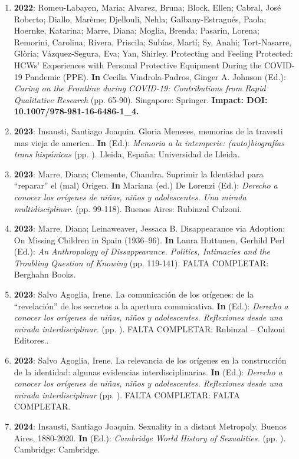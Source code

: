 \begin{enumerate}
\item {\bf 2022}: Romeu-Labayen, Maria; Alvarez, Bruna; Block, Ellen; Cabral, José Roberto; Diallo, Marème; Djellouli, Nehla; Galbany-Estragués, Paola; Hoernke, Katarina; Marre, Diana; Moglia, Brenda; Pasarin, Lorena; Remorini, Carolina; Rivera, Priscila; Subías, Martí; Sy, Anahi; Tort-Nasarre, Glòria; Vázquez-Segura, Eva; Yan, Shirley. Protecting and Feeling Protected: HCWs’ Experiences with Personal Protective Equipment During the COVID-19 Pandemic (PPE). {\bf In} Cecilia Vindrola-Padros, Ginger A. Johnson (Ed.): {\it Caring on the Frontline during COVID-19: Contributions from Rapid Qualitative Research} (pp. 65-90). Singapore: Springer. {\bf Impact: DOI: 10.1007/978-981-16-6486-1\_4.}\filbreak
\item {\bf 2023}: Insausti, Santiago Joaquin. Gloria Meneses, memorias de la travesti mas vieja de america.. {\bf In}  (Ed.): {\it Memoria a la intemperie: (auto)biografías trans hispánicas} (pp. ). Lleida, España: Universidad de Lleida. {\bf }\filbreak
\item {\bf 2023}: Marre, Diana; Clemente, Chandra. Suprimir la Identidad para “reparar” el (mal) Origen. {\bf In} Mariana (ed.) De Lorenzi (Ed.): {\it Derecho a conocer los orígenes de niñas, niños y adolescentes. Una mirada multidisciplinar.} (pp. 99-118). Buenos Aires: Rubinzal Culzoni. {\bf }\filbreak
\item {\bf 2023}: Marre, Diana; Leinaweaver, Jessaca B. Disappearance via Adoption: On Missing Children in Spain (1936–96). {\bf In} Laura Huttunen, Gerhild Perl (Ed.): {\it An Anthropology of Dissappearance. Politics, Intimacies and the Troubling Question of Knowing} (pp. 119-141). FALTA COMPLETAR: Berghahn Books. {\bf }\filbreak
\item {\bf 2023}: Salvo Agoglia, Irene. La comunicación de los orígenes: de la “revelación” de los secretos a la apertura comunicativa. {\bf In}  (Ed.): {\it Derecho a conocer los orígenes de niñas, niños y adolescentes. Reflexiones desde una mirada interdisciplinar.} (pp. ). FALTA COMPLETAR: Rubinzal – Culzoni Editores.. {\bf }\filbreak
\item {\bf 2023}: Salvo Agoglia, Irene. La relevancia de los orígenes en la construcción de la identidad: algunas evidencias interdisciplinarias. {\bf In}  (Ed.): {\it Derecho a conocer los orígenes de niñas, niños y adolescentes. Reflexiones desde una mirada interdisciplinar} (pp. ). FALTA COMPLETAR: FALTA COMPLETAR. {\bf }\filbreak
\item {\bf 2024}: Insausti, Santiago Joaquin. Sexuality in a distant Metropoly. Buenos Aires, 1880-2020. {\bf In}  (Ed.): {\it Cambridge World History of Sexualities.} (pp. ). Cambridge: Cambridge. {\bf }\filbreak

\end{enumerate}
